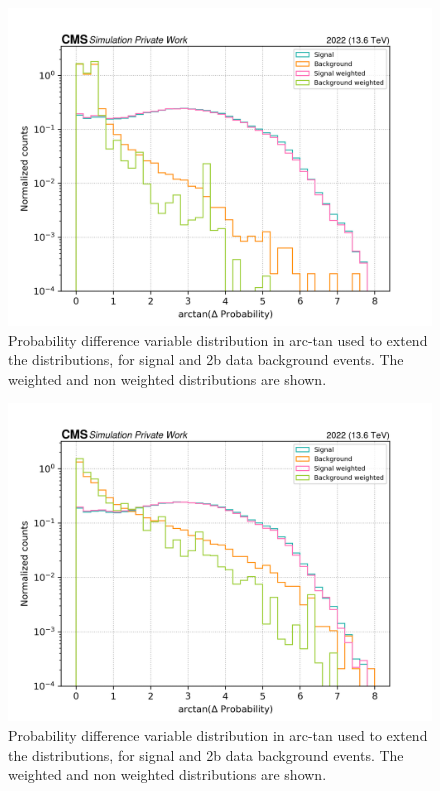 \begin{figure}
    \centering
    \includegraphics[width=0.7\linewidth]{Images/7.S:B/Prob diff/2b QCD arctan.png}
    \caption{Probability difference variable distribution in arc-tan used to extend the distributions, for signal and 2b data background events. The weighted and non weighted distributions are shown.}
    \label{fig: 2b QCD PD}
\end{figure}


\begin{figure}[hbt]
    \centering
    \includegraphics[width=0.7\linewidth]{Images/7.S:B/Prob diff/4b QCD arctan.png}
    \caption{Probability difference variable distribution in arc-tan used to extend the distributions, for signal and 2b data background events. The weighted and non weighted distributions are shown.}
    \label{fig: 4b QCD PD}
\end{figure}


